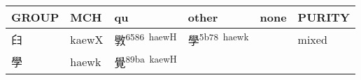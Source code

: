 \documentclass[14pt,a4paper]{scrartcl}
\begin{document}
\begin{longtable}[c]{@{}llllll@{}}
\toprule
\begin{minipage}[b]{0.14\columnwidth}\raggedright\strut
GROUP
\strut\end{minipage} &
\begin{minipage}[b]{0.14\columnwidth}\raggedright\strut
MCH
\strut\end{minipage} &
\begin{minipage}[b]{0.14\columnwidth}\raggedright\strut
qu
\strut\end{minipage} &
\begin{minipage}[b]{0.14\columnwidth}\raggedright\strut
other
\strut\end{minipage} &
\begin{minipage}[b]{0.14\columnwidth}\raggedright\strut
none
\strut\end{minipage} &
\begin{minipage}[b]{0.14\columnwidth}\raggedright\strut
PURITY
\strut\end{minipage}\tabularnewline
\midrule
\endhead
\begin{minipage}[t]{0.14\columnwidth}\raggedright\strut
𦥑
\strut\end{minipage} &
\begin{minipage}[t]{0.14\columnwidth}\raggedright\strut
kaewX
\strut\end{minipage} &
\begin{minipage}[t]{0.14\columnwidth}\raggedright\strut
斆\textsuperscript{6586~haewH}
\strut\end{minipage} &
\begin{minipage}[t]{0.14\columnwidth}\raggedright\strut
學\textsuperscript{5b78~haewk}
\strut\end{minipage} &
\begin{minipage}[t]{0.14\columnwidth}\raggedright\strut
\strut\end{minipage} &
\begin{minipage}[t]{0.14\columnwidth}\raggedright\strut
mixed
\strut\end{minipage}\tabularnewline
\begin{minipage}[t]{0.14\columnwidth}\raggedright\strut
學
\strut\end{minipage} &
\begin{minipage}[t]{0.14\columnwidth}\raggedright\strut
haewk
\strut\end{minipage} &
\begin{minipage}[t]{0.14\columnwidth}\raggedright\strut
覺\textsuperscript{89ba~kaewH}
\strut\end{minipage} &

\end{longtable}
\end{document}
